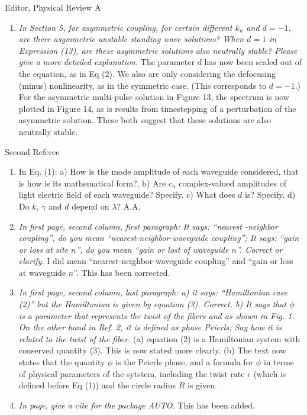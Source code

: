 \documentclass[11pt]{letter}
\begin{document}
\begin{letter}{Editor, Physical Review A}
\begin{enumerate}
\item \emph{In Section 5, for asymmetric coupling, for certain different $k_{n}$ and $d=-1$, are there asymmetric unstable standing wave solutions? When $d=1$ in Expression (13), are these asymmetric solutions also neutrally stable? Please give a more detailed explanation.} The parameter $d$ has now been scaled out of the equation, as in Eq (2). We also are only considering the defocusing (minus) nonlinearity, as in the symmetric case. (This corresponds to $d=-1$.) For the asymmetric multi-pulse solution in Figure 13, the spectrum is now plotted in Figure 14, as is results from timestepping of a perturbation of the asymmetric solution. These both suggest that these solutions are also neutrally stable.

\end{enumerate}

Second Referee
\begin{enumerate}
\item In Eq. (1): a) How is the mode amplitude of each waveguide considered, that is how is its mathematical form?, b) Are $c_n$ complex-valued amplitudes of light electric field of each waveguide? Specify. c) What does $d$ is? Specify. d) Do $k$, $\gamma$ and $d$ depend on $\lambda$? A.A.

\item \emph{In first page, second column, first paragraph: It says: ``nearest -neighbor coupling'', do you mean ``nearest-neighbor-waveguide coupling''; It says: ``gain or loss at site $n$'', do you mean ``gain or lost of waveguide $n$''. Correct or clarify.} I did mean ``nearest-neighbor-waveguide coupling'' and ``gain or loss at waveguide $n$''. This has been corrected.

\item \emph{In first page, second column, last paragraph: a) it says: ``Hamiltonian case (2)'' but the Hamiltonian is given by equation (3). Correct. b) It says that $\phi$ is a parameter that represents the twist of the fibers and as shown in Fig. 1. On the other hand in Ref. 2, it is defined as phase Peierls; Say how it is related to the twist of the fiber.} (a) equation (2) is a Hamiltonian system with conserved quantity (3). This is now stated more clearly. (b) The text now states that the quantity $\phi$ is the Peierls phase, and a formula for $\phi$ in terms of physical parameters of the sytstem, including the twist rate $\epsilon$ (which is defined before Eq (1)) and the circle radius $R$ is given.

\item \emph{In page, give a cite for the package AUTO.} This has been added.


\end{enumerate}
\end{letter}
\end{document}
